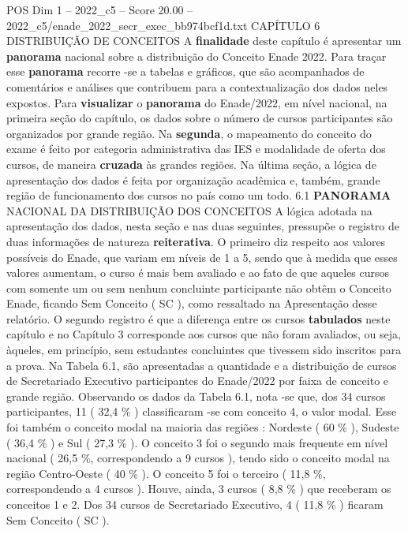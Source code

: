 \begin{textsample}{POS Dim 1 – 2022\_c5 – Score 20.00 – 2022\_c5/enade\_2022\_secr\_exec\_bb974bcf1d.txt}  \label{ex:f1_pos_024}
CAPÍTULO 6 DISTRIBUIÇÃO DE CONCEITOS A \textbf{finalidade} deste capítulo é apresentar um \textbf{panorama} nacional sobre a distribuição do Conceito Enade 2022.
Para traçar esse \textbf{panorama} recorre -se a tabelas e gráficos, que são acompanhados de comentários e análises que contribuem para a contextualização dos dados neles expostos.
Para \textbf{visualizar} o \textbf{panorama} do Enade/2022, em nível nacional, na primeira seção do capítulo, os dados sobre o número de cursos participantes são organizados por grande região.
Na \textbf{segunda}, o mapeamento do conceito do exame é feito por categoria administrativa das IES e modalidade de oferta dos cursos, de maneira \textbf{cruzada} às grandes regiões.
Na última seção, a lógica de apresentação dos dados é feita por organização acadêmica e, também, grande região de funcionamento dos cursos no país como um todo. 6.1 \textbf{PANORAMA} NACIONAL DA DISTRIBUIÇÃO DOS CONCEITOS A lógica adotada na apresentação dos dados, nesta seção e nas duas seguintes, pressupõe o registro de duas informações de natureza \textbf{reiterativa}.
O primeiro diz respeito aos valores possíveis do Enade, que variam em níveis de 1 a 5, sendo que à medida que esses valores aumentam, o curso é mais bem avaliado e ao fato de que aqueles cursos com somente um ou sem nenhum concluinte participante não obtêm o Conceito Enade, ficando Sem Conceito ( SC ), como ressaltado na Apresentação desse relatório.
O segundo registro é que a diferença entre os cursos \textbf{tabulados} neste capítulo e no Capítulo 3 corresponde aos cursos que não foram avaliados, ou seja, àqueles, em princípio, sem estudantes concluintes que tivessem sido inscritos para a prova.
Na Tabela 6.1, são apresentadas a quantidade e a distribuição de cursos de Secretariado Executivo participantes do Enade/2022 por faixa de conceito e grande região.
Observando os dados da Tabela 6.1, nota -se que, dos 34 cursos participantes, 11 ( 32,4 \% ) classificaram -se com conceito 4, o valor modal.
Esse foi também o conceito modal na maioria das regiões : Nordeste ( 60 \% ), Sudeste ( 36,4 \% ) e Sul ( 27,3 \% ).
O conceito 3 foi o segundo mais frequente em nível nacional ( 26,5 \%, correspondendo a 9 cursos ), tendo sido o conceito modal na região Centro-Oeste ( 40 \% ).
O conceito 5 foi o terceiro ( 11,8 \%, correspondendo a 4 cursos ).
Houve, ainda, 3 cursos ( 8,8 \% ) que receberam os conceitos 1 e 2.
Dos 34 cursos de Secretariado Executivo, 4 ( 11,8 \% ) ficaram Sem Conceito ( SC ).

\end{textsample}
